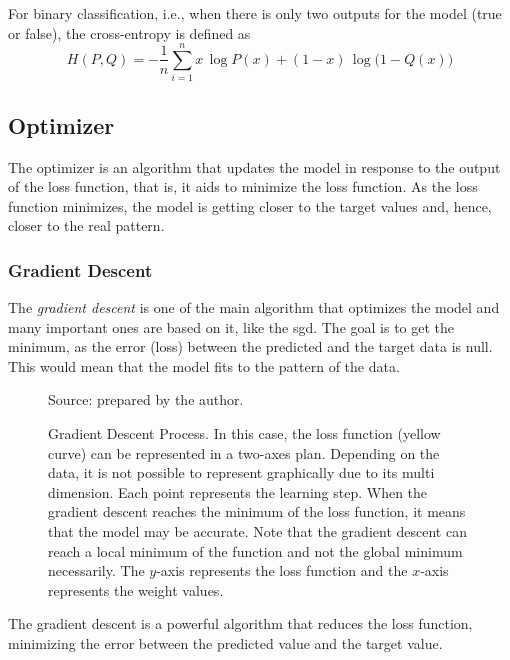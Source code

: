 For binary classification, i.e., when there is only two outputs for the model (true or false), the cross-entropy is defined as
%
\begin{equation}
    H(P,Q) = - \frac{1}{n} \sum_{i=1}^n x \, \log P(x) + (1-x) \, \log \Big(1-Q(x)\Big)
    \label{eq:binary_cross_entropy}
\end{equation}

\subsection{Optimizer}\label{sec:optimizer}

The optimizer is an algorithm that updates the model in response to the output of the loss function, that is, it aids to minimize the loss function. 
As the loss function minimizes, the model is getting closer to the target values and, hence, closer to the real pattern.

\subsubsection*{Gradient Descent} 

The \emph{gradient descent} is one of the main algorithm \citep{nesterov2004} that optimizes the model and many important ones are based on it, like the \gls*{sgd}. The goal is to get the minimum, as the error (loss) between the predicted and the target data is null. This would mean that the model fits to the pattern of the data.
%
\begin{figure}[!htb]
    \centering
    \caption[Gradient Descent Process]{Gradient Descent Process. In this case, the loss function (yellow curve) can be represented in a two-axes plan. Depending on the data, it is not possible to represent graphically due to its multi dimension. Each point represents the learning step. When the gradient descent reaches the minimum of the loss function, it means that the model may be accurate. Note that the gradient descent can reach a local minimum of the function and not the global minimum necessarily. The \(y\)-axis represents the loss function and the \(x\)-axis represents the weight values.}
    
    \begin{flushleft}\footnotesize
        Source: prepared by the author.
    \end{flushleft}
    
\end{figure}

The gradient descent is a powerful algorithm that reduces the loss function, minimizing the error between the predicted value and the target value.

